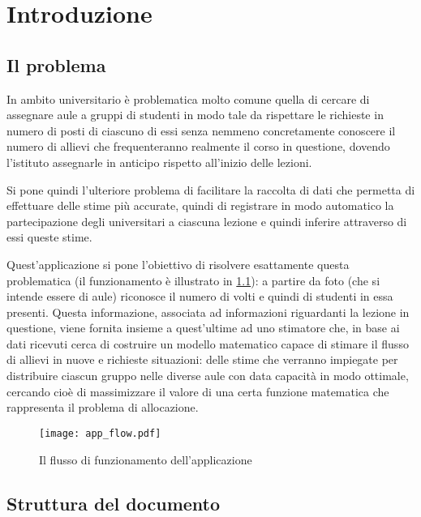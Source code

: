 \chapter{Introduzione}

\section{Il problema}

In ambito universitario è problematica molto comune quella di cercare di assegnare aule a 
gruppi di studenti in modo tale da rispettare le richieste in numero di posti
di ciascuno di essi senza nemmeno concretamente conoscere il numero di allievi che frequenteranno 
realmente il corso in questione, dovendo l'istituto assegnarle in anticipo rispetto all'inizio
delle lezioni.

Si pone quindi l'ulteriore problema di facilitare la raccolta di dati che permetta di effettuare 
delle stime più accurate, quindi di registrare in modo automatico la partecipazione degli universitari
a ciascuna lezione e quindi inferire attraverso di essi queste stime.

\medskip

Quest'applicazione si pone l'obiettivo di risolvere esattamente questa problematica (il funzionamento è 
illustrato in \ref{fig:app_flow}):
a partire da foto (che si intende essere di aule) riconosce il numero di volti e quindi di studenti in essa 
presenti. Questa informazione, associata ad informazioni riguardanti la lezione in questione, viene fornita 
insieme a quest'ultime ad uno stimatore che, in base ai dati ricevuti cerca di costruire un modello matematico 
capace di stimare il flusso di allievi in nuove e richieste situazioni: delle stime che verranno impiegate 
per distribuire ciascun gruppo nelle diverse aule con data capacità in modo ottimale, cercando cioè di 
massimizzare il valore di una certa funzione matematica che rappresenta il problema di allocazione. 

\begin{figure}
    \begin{small}
        \begin{center}
            \texttt{[image: app\_flow.pdf]}
        \end{center}
        \caption{Il flusso di funzionamento dell'applicazione}
        \label{fig:app_flow}
    \end{small}
\end{figure}

\section{Struttura del documento}

